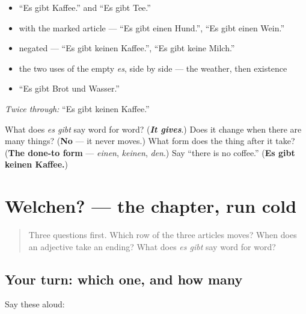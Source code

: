 \begin{itemize}
\raggedright
  \item \textquotedblleft{}Es gibt Kaffee.\textquotedblright{} and \textquotedblleft{}Es gibt Tee.\textquotedblright{}
  \item with the marked article — \textquotedblleft{}Es gibt einen Hund.\textquotedblright{}, \textquotedblleft{}Es gibt einen Wein.\textquotedblright{}
  \item negated — \textquotedblleft{}Es gibt keinen Kaffee.\textquotedblright{}, \textquotedblleft{}Es gibt keine Milch.\textquotedblright{}
  \item the two uses of the empty \emph{es}, side by side — the weather, then existence
  \item \textquotedblleft{}Es gibt Brot und Wasser.\textquotedblright{}
\end{itemize}

\emph{Twice through:} \textquotedblleft{}Es gibt keinen Kaffee.\textquotedblright{}

\begin{tcolorbox}[breakable,colback=teal!4,colframe=teal!35!black,title={Before you move on}]
What does \emph{es gibt} say word for word? (\emph{\textbf{It gives}}.) Does it change when there are many things? (\textbf{No} — it never moves.) What form does the thing after it take? (\textbf{The done-to form} — \emph{einen}, \emph{keinen}, \emph{den}.) Say \textquotedblleft{}there is no coffee.\textquotedblright{} (\textbf{Es gibt keinen Kaffee.})
\end{tcolorbox}
\section[Practice]{Welchen? — the chapter, run cold}

\label{lesson:GE-R34-welchen}



\begin{quote}
Three questions first. Which row of the three articles moves? When does an adjective take an ending? What does \emph{es gibt} say word for word?
\end{quote}

\subsection*{Your turn: which one, and how many}
Say these aloud:


